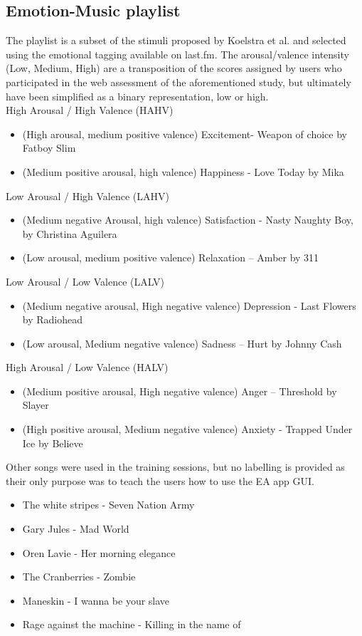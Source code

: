 \subsection{Emotion-Music playlist}
\label{sec:appendix_A2.2}
The playlist is a subset of the stimuli proposed by Koelstra et al. \cite{koelstra_deap_2012} and selected using the emotional tagging available on last.fm. The arousal/valence intensity (Low, Medium, High) are a transposition of the scores assigned by users who participated in the web assessment of the aforementioned study, but ultimately have been simplified as a binary representation, low or high.
\\
High Arousal / High Valence (HAHV)
\begin{itemize}
\item  (High arousal, medium positive valence) Excitement- Weapon of choice by Fatboy Slim
\item  (Medium positive arousal, high valence) Happiness - Love Today by Mika
\end{itemize}

Low Arousal / High Valence (LAHV)
\begin{itemize}
\item  (Medium negative Arousal, high valence) Satisfaction - Nasty Naughty Boy, by Christina Aguilera
\item 	 (Low arousal, medium positive valence) Relaxation – Amber by 311
\end{itemize}

Low Arousal / Low Valence (LALV)
\begin{itemize}
\item  (Medium negative arousal, High negative valence) Depression - Last Flowers by Radiohead
\item  (Low arousal, Medium negative valence) Sadness – Hurt by Johnny Cash
\end{itemize}

High Arousal / Low Valence (HALV)
\begin{itemize}
\item  (Medium positive arousal, High negative valence) Anger – Threshold by Slayer
\item  (High positive arousal, Medium negative valence) Anxiety - Trapped Under Ice by Believe
\end{itemize}

Other songs were used in the training sessions, but no labelling is provided as their only purpose was 
to teach the users how to use the EA app GUI.
\begin{itemize}
\item  The white stripes - Seven Nation Army
\item  Gary Jules - Mad World
\item  Oren Lavie - Her morning elegance
\item  The Cranberries - Zombie
\item  Maneskin - I wanna be your slave
\item  Rage against the machine - Killing in the name of
\end{itemize}



